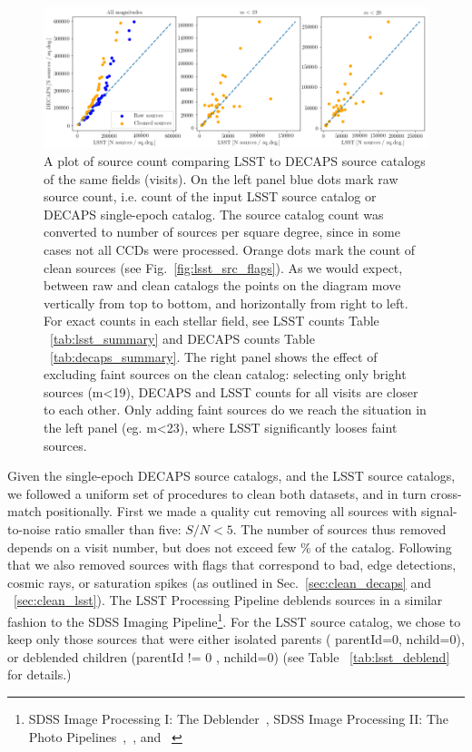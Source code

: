 \documentclass[DM,lsstdraft,toc,usenatbib]{lsstdoc}
\begin{document}
\begin{figure}
\begin{centering}
\includegraphics[width=0.9\columnwidth]{figs/decaps_lsst_source_count.png}
\caption{A plot of source count comparing LSST to DECAPS source catalogs of the same fields (visits). On the left panel blue dots mark raw source count, i.e. count of the input LSST  source catalog or DECAPS single-epoch catalog. The source catalog count was converted to number of sources per square degree, since in some cases not all CCDs were processed.  Orange dots mark the count of clean sources (see Fig.~\ref{fig:lsst_src_flags}). As we would expect, between raw and clean catalogs the points on the diagram move vertically from top to bottom, and horizontally from right to left. For exact counts in each stellar field, see LSST counts Table ~\ref{tab:lsst_summary} and DECAPS counts Table ~\ref{tab:decaps_summary}.  The right panel shows the effect of excluding faint sources on the clean catalog: selecting only bright sources (m<19),  DECAPS and LSST counts for all visits are closer to each other. Only adding faint sources do we reach the situation in the left panel (eg. m<23), where LSST significantly looses faint sources. }
\label{fig:lsst_count_comparison}
\end{centering}
\end{figure} 


Given the single-epoch DECAPS source catalogs, and the LSST source catalogs, we followed a uniform set of procedures to clean both datasets, and in turn cross-match positionally. First we made a quality cut removing all sources with signal-to-noise ratio smaller than five:  $S/N < 5$. The number of sources thus removed depends on a visit number, but does not exceed few \% of the catalog. Following that we also removed sources with flags that correspond to bad, edge detections, cosmic rays, or saturation spikes (as outlined in Sec.~\ref{sec:clean_decaps} and ~\ref{sec:clean_lsst}). The LSST Processing Pipeline deblends sources in a similar fashion to the SDSS Imaging Pipeline\footnote{SDSS Image Processing I: The Deblender~\citep{lupton2005}, SDSS Image Processing II: The Photo Pipelines~\citep{lupton2001},~\citep{lupton2002}, and ~\citep{lupton2005a}}.   For the LSST source catalog,  we chose to keep only those sources that were either isolated parents ( parentId=0, nchild=0), or deblended children (parentId != 0 , nchild=0) (see Table ~\ref{tab:lsst_deblend} for details.)
\end{document}
